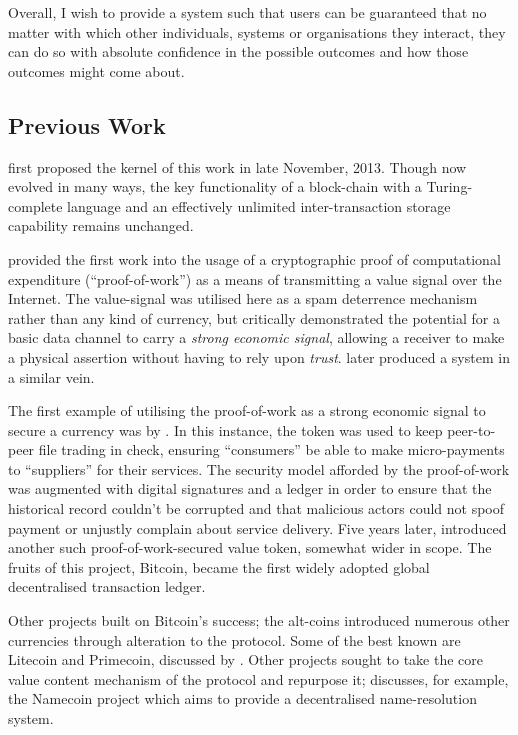 \documentclass[9pt,oneside]{amsart}
\begin{document}
\begin{multicols}{2}
Overall, I wish to provide a system such that users can be guaranteed that no matter with which other individuals, systems or organisations they interact, they can do so with absolute confidence in the possible outcomes and how those outcomes might come about.

\subsection{Previous Work} \label{ch:previous}

\cite{buterin2013ethereum} first proposed the kernel of this work in late November, 2013. Though now evolved in many ways, the key functionality of a block-chain with a Turing-complete language and an effectively unlimited inter-transaction storage capability remains unchanged.

\cite{dwork92pricingvia} provided the first work into the usage of a cryptographic proof of computational expenditure (``proof-of-work'') as a means of transmitting a value signal over the Internet. The value-signal was utilised here as a spam deterrence mechanism rather than any kind of currency, but critically demonstrated the potential for a basic data channel to carry a \textit{strong economic signal}, allowing a receiver to make a physical assertion without having to rely upon \textit{trust}. \cite{back2002hashcash} later produced a system in a similar vein.

The first example of utilising the proof-of-work as a strong economic signal to secure a currency was by \cite{vishnumurthy03karma:a}. In this instance, the token was used to keep peer-to-peer file trading in check, ensuring ``consumers'' be able to make micro-payments to ``suppliers'' for their services. The security model afforded by the proof-of-work was augmented with digital signatures and a ledger in order to ensure that the historical record couldn't be corrupted and that malicious actors could not spoof payment or unjustly complain about service delivery. Five years later, \cite{nakamoto2008bitcoin} introduced another such proof-of-work-secured value token, somewhat wider in scope. The fruits of this project, Bitcoin, became the first widely adopted global decentralised transaction ledger.

Other projects built on Bitcoin's success; the alt-coins introduced numerous other currencies through alteration to the protocol. Some of the best known are Litecoin and Primecoin, discussed by \cite{sprankel2013technical}. Other projects sought to take the core value content mechanism of the protocol and repurpose it; \cite{aron2012bitcoin} discusses, for example, the Namecoin project which aims to provide a decentralised name-resolution system.


\end{multicols}
\end{document}
